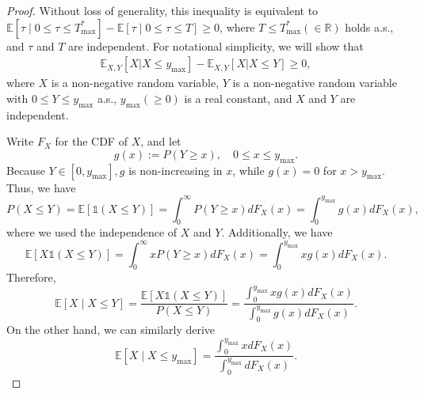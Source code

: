 \documentclass{article}
\theoremstyle{plain}
\theoremstyle{definition}
\theoremstyle{remark}
\def\mbe{\mathbb{E}}
\def\mbone{\mathds{1}}
\begin{document}
\begin{proof}
    Without loss of generality, this inequality is equivalent to
    $\mbe[ \tau \mid 0 \leq \tau \leq T_\mathrm{max}^*] - \mbe[\tau \mid 0 \leq \tau \leq T] \geq 0$, 
    where $ T \leq T_{\mathrm{max}}^{*} (\in \mathbb{R})$ holds a.s., and $\tau$ and $T$ are independent.
    For notational simplicity, we will show that 
    \begin{align}
        \mathbb{E}_{X,Y} [X | X \leq y_{\mathrm{max}}] - \mathbb{E}_{X,Y} [X | X \leq Y] \geq 0 ,  
        \label{eq:tmpineq_simplified_ineq}
    \end{align}
    where $X$ is a non-negative random variable, $Y$ is a non-negative random variable with $0 \leq Y \leq y_{\mathrm{max}}$ a.s., $y_{\mathrm{max}} (\geq 0)$ is a real constant, and $X$ and $Y$ are independent.

    Write $F_X$ for the CDF of $X$, and let
    \begin{equation}
        g(x) := P(Y \geq x), \quad 0 \leq x \leq y_{\mathrm{max}} .
    \end{equation}
    Because $Y \in\left[0, y_{\mathrm{max}}\right], g$ is non-increasing in $x$, while $g(x)=0$ for $x > y_{\mathrm{max}}$.
    Thus, we have
    \begin{equation}
        P(X \leq Y) 
        = \mathbb{E}\left[\mbone (X \leq Y) \right] 
        = \int_0^{\infty} P(Y \geq x) d F_X(x)=\int_0^{y_{\mathrm{max}}} g(x) d F_X(x),
    \end{equation}
    where we used the independence of $X$ and $Y$. Additionally, we have
    \begin{equation}
        \mathbb{E}\left[X  \mbone (X \leq Y)\right] 
        = \int_0^{\infty} x P(Y \geq x) d F_X(x) 
        =\int_0^{y_{\mathrm{max }}} x g(x) d F_X(x) .
    \end{equation}
    Therefore,
    \begin{equation}
        \mathbb{E}[X \mid X \leq Y]
        = \frac{\mathbb{E}\left[X  \mbone (X \leq Y)\right]}{P(X \leq Y)}
        = \frac{\int_0^{y_{\mathrm{max}}} x g(x) d F_X(x)}{\int_0^{y_{\mathrm{max}}} g(x) d F_X(x)} . \label{eq:tmpeq1_lem_b6}
    \end{equation}
    On the other hand, we can similarly derive
    \begin{equation}
       \mathbb{E}\left[X \mid X \leq y_{\mathrm{max}}\right]=\frac{\int_0^{y_{\mathrm{max}}} x d F_X(x)}{\int_0^{y_{\mathrm{max}}} d F_X(x)}.
       \label{eq:tmpeq2_lem_b6}
    \end{equation}


\end{proof}
\end{document}
